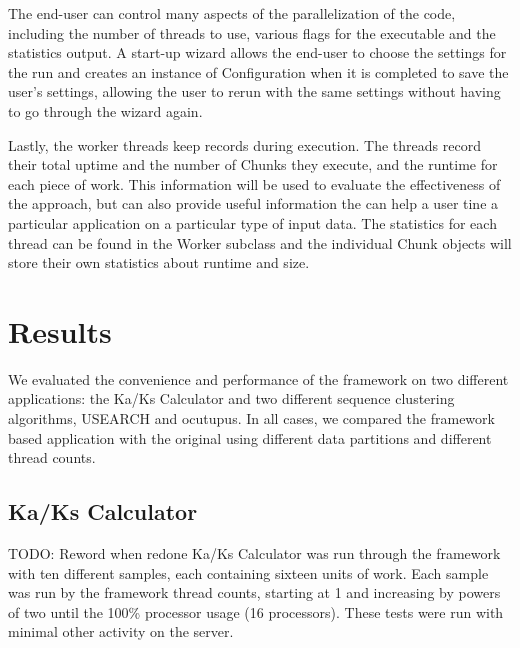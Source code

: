 \documentclass[12pt]{article}
\begin{document}
The end-user can control many aspects of the parallelization of the code,
including the number of threads to use, various flags for the executable and the
statistics output.  A start-up wizard allows the end-user to choose the settings
for the run and creates an instance of Configuration when it is completed to
save the user's settings, allowing the user to rerun with the same settings
without having to go through the wizard again.

Lastly, the worker threads keep records during execution. The threads record
their total uptime and the number of Chunks they execute, and the runtime for
each piece of work. This information will be used to evaluate the effectiveness
of the approach, but can also provide useful information the can help a user
tine a particular application on a particular type of input data. The statistics
for each thread can be found in the Worker subclass and the individual Chunk
objects will store their own statistics about runtime and size.

\section{Results}

We evaluated the convenience and performance of the framework on two different
applications: the Ka/Ks Calculator and two different sequence clustering
algorithms, USEARCH and ocutupus. In all cases, we compared the framework based
application with the original using different data partitions and different
thread counts.

\subsection{Ka/Ks Calculator}
TODO: Reword when redone
Ka/Ks Calculator was run through the framework with ten different samples, each
containing sixteen units of work. Each sample was run by the framework thread
counts, starting at 1 and increasing by powers of two until the 100\% processor
usage (16 processors). These tests were run with minimal other activity on the
server.
\end{document}
